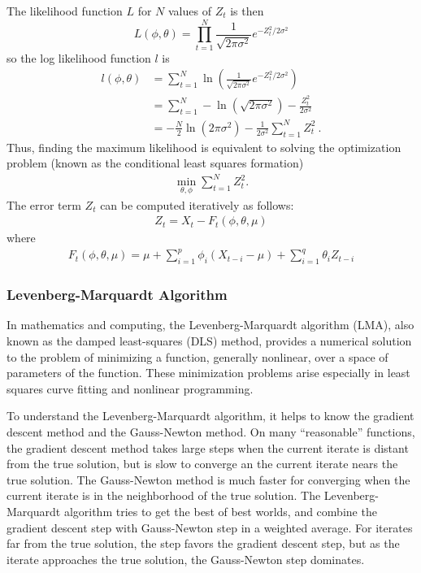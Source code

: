 The likelihood function $L$ for $N$ values of $Z_t$  is then
\begin{equation}
L(\phi, \theta) = \prod_{t = 1}^N  \frac{1}{\sqrt{2 \pi \sigma^2}} e^{-Z^2_t/2 \sigma^2}
\end{equation}
so the log likelihood function $l$ is
\begin{align}
l(\phi, \theta) &= \sum_{t = 1}^N \ln \left(\frac{1}{\sqrt{2 \pi \sigma^2}} e^{-Z^2_t/2 \sigma^2}
 \right) \nonumber\\
 &=  \sum_{t = 1}^N  - \ln \left( \sqrt{2 \pi \sigma^2}\right)  -\frac{Z^2_t}{2 \sigma^2}\nonumber\\
&=  -\frac{N}{2} \ln \left( 2 \pi \sigma^2\right)  - \frac{1}{2
  \sigma^2} \sum_{t = 1}^N   Z^2_t\ . \label{eq:loglikelihood}
\end{align}
Thus, finding the maximum likelihood is equivalent to solving the
optimization problem (known as the conditional least squares
formation)
\begin{align}
\min_{\theta, \phi} \sum_{t = 1}^N  Z^2_t.
\end{align}
The error term $Z_t$ can be computed iteratively as follows:
\begin{align}\label{equ:error terms}
Z_t = X_t - F_t(\phi, \theta, \mu)
\end{align}
where
\begin{align}
F_t(\phi, \theta, \mu) = \mu + \sum_{i=1}^p \phi_i (X_{t-i}-\mu) + \sum_{i=1}^q \theta_i Z_{t-i}
\end{align}

\subsubsection{Levenberg-Marquardt Algorithm}
In mathematics and computing, the Levenberg-Marquardt algorithm (LMA),
also known as the damped least-squares (DLS) method, provides a
numerical solution to the problem of minimizing a function, generally
nonlinear, over a space of parameters of the function. These
minimization problems arise especially in least squares curve fitting
and nonlinear programming.

To understand the Levenberg-Marquardt algorithm, it helps to know the
gradient descent method and the Gauss-Newton method.  On many
``reasonable'' functions, the gradient descent method takes large
steps when the current iterate is distant from the true solution, but
is slow to converge an the current iterate nears the true solution.
The Gauss-Newton method is much faster for converging when the current
iterate is in the neighborhood of the true solution.  The
Levenberg-Marquardt algorithm tries to get the best of best worlds,
and combine the gradient descent step with Gauss-Newton step in a
weighted average.  For iterates far from the true solution, the step
favors the gradient descent step, but as the iterate approaches the
true solution, the Gauss-Newton step dominates.

